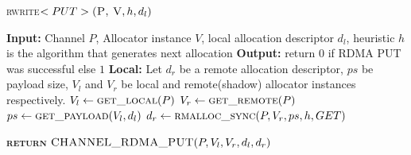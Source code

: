 \documentclass[10pt]{article}
\begin{document}
\begin{algorithm}{}
\footnotesize
\caption{\textsc{rwrite}{$<PUT>\textsc{(P, V}, h, d_l)$}}
\label{alg:rread_PUT} 
\begin{algorithmic}[1]


\STATE \textbf{Input:} Channel $P$, Allocator instance $V$, local allocation descriptor $d_l$,  heuristic $h$ is the algorithm that generates next allocation
\STATE \textbf{Output:} return {$0$} if RDMA PUT was successful else {$1$}
\STATE \textbf{Local:} Let $d_r$ be a remote allocation descriptor,  $ps$ be payload size, $V_l$ and $V_r$ be local and remote(shadow) allocator instances respectively.
\STATE \quad $\textbf{$V_l$} \leftarrow  \textsc{get\_local}(P)$ 
\STATE \quad $\textbf{$V_r$} \leftarrow  \textsc{get\_remote}(P)$ 
\STATE \quad $\textbf{$ps$} \leftarrow  \textsc{get\_payload}(V_l, d_l)$ 
\STATE \quad $\textbf{$d_r$} \leftarrow  \textsc{rmalloc\_sync}(P, V_r, ps, h, GET)$ 

\STATE \textsc{\textbf{return}} {$\textsc{CHANNEL\_RDMA\_PUT}(P, V_l, V_r, d_l, d_r)$}
\STATE


\end{algorithmic}
\end{algorithm}
\end{document}
